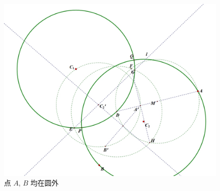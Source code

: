 \begin{remark}
\begin{figure}[htbp]
        \centering            
        \includegraphics[scale = 0.31]{Figures/怀新一题(4).png}
        \caption{点 $A$, $B$ 均在圆外}
    \end{figure}
\end{remark}